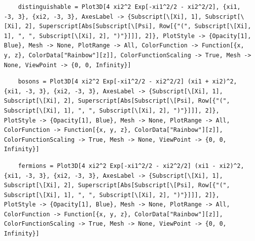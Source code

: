 \documentclass[11pt]{article}
\begin{document}

\begin{lstlisting}
    distinguishable = Plot3D[4 xi2^2 Exp[-xi1^2/2 - xi2^2/2], {xi1, -3, 3}, {xi2, -3, 3}, AxesLabel -> {Subscript[\[Xi], 1], Subscript[\[Xi], 2], Superscript[Abs[Subscript[\[Psi], Row[{"(", Subscript[\[Xi], 1], ", ", Subscript[\[Xi], 2], ")"}]]], 2]}, PlotStyle -> {Opacity[1], Blue}, Mesh -> None, PlotRange -> All, ColorFunction -> Function[{x, y, z}, ColorData["Rainbow"][z]], ColorFunctionScaling -> True, Mesh -> None, ViewPoint -> {0, 0, Infinity}]
\end{lstlisting}

\begin{lstlisting}
    bosons = Plot3D[4 xi2^2 Exp[-xi1^2/2 - xi2^2/2] (xi1 + xi2)^2, {xi1, -3, 3}, {xi2, -3, 3}, AxesLabel -> {Subscript[\[Xi], 1], Subscript[\[Xi], 2], Superscript[Abs[Subscript[\[Psi], Row[{"(", Subscript[\[Xi], 1], ", ", Subscript[\[Xi], 2], ")"}]]], 2]}, PlotStyle -> {Opacity[1], Blue}, Mesh -> None, PlotRange -> All, ColorFunction -> Function[{x, y, z}, ColorData["Rainbow"][z]], ColorFunctionScaling -> True, Mesh -> None, ViewPoint -> {0, 0, Infinity}]
\end{lstlisting}

\begin{lstlisting}
    fermions = Plot3D[4 xi2^2 Exp[-xi1^2/2 - xi2^2/2] (xi1 - xi2)^2, {xi1, -3, 3}, {xi2, -3, 3}, AxesLabel -> {Subscript[\[Xi], 1], Subscript[\[Xi], 2], Superscript[Abs[Subscript[\[Psi], Row[{"(", Subscript[\[Xi], 1], ", ", Subscript[\[Xi], 2], ")"}]]], 2]}, PlotStyle -> {Opacity[1], Blue}, Mesh -> None, PlotRange -> All, ColorFunction -> Function[{x, y, z}, ColorData["Rainbow"][z]], ColorFunctionScaling -> True, Mesh -> None, ViewPoint -> {0, 0, Infinity}]
\end{lstlisting}
\end{document}
